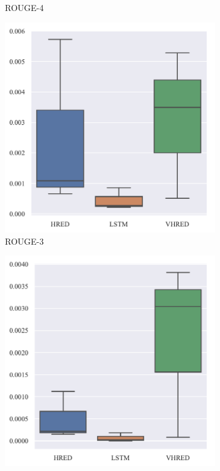 \begin{figure}[H]
\begin{subfigure}{0.23\linewidth}
        \caption{ROUGE-4}
    \end{subfigure}%
    \begin{subfigure}{0.23\linewidth}
        \centering
        \includegraphics[width=\linewidth]{figure/boxplot/model/rouge_3/plot.pdf}
        \caption{ROUGE-3}
    \end{subfigure}%
    \begin{subfigure}{0.23\linewidth}
        \centering
        \includegraphics[width=\linewidth]{figure/boxplot/model/rouge_4/plot.pdf}

\end{subfigure}
\end{figure}
